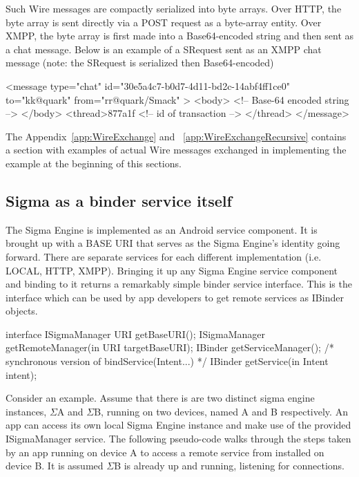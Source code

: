\documentclass[prodmode]{acmlarge}
\begin{document}
Such Wire messages are compactly serialized into byte arrays. Over HTTP, the byte array is sent directly via a POST request as a byte-array entity. Over XMPP, the byte array is first made into a Base64-encoded string and then sent as a chat message. Below is an example of a SRequest sent as an XMPP chat message (note: the SRequest is serialized then Base64-encoded)

\begin{snippet}
<message type="chat" id="30e5a4c7-b0d7-4d11-bd2c-14abf4ff1ce0"
        to="kk@quark" from="rr@quark/Smack" >
        <body> <!-- Base-64 encoded string --> </body>
        <thread>877a1f <!-- id of transaction --> </thread>
        </message>
\end{snippet}

The Appendix~\ref{app:WireExchange} and ~\ref{app:WireExchangeRecursive} contains a section with examples of actual Wire messages exchanged in implementing the example at the beginning of this sections.

\subsection{Sigma as a binder service itself}
The Sigma Engine is implemented as an Android service component. It is brought up with a BASE URI that serves as the Sigma Engine's identity going forward. There are separate services for each different implementation (i.e. LOCAL, HTTP, XMPP). Bringing it up any Sigma Engine service component and binding to it returns a remarkably simple binder service interface. This is the interface which can be used by app developers to get remote services as IBinder objects.

\begin{snippet}
interface ISigmaManager {
    URI getBaseURI();
    ISigmaManager getRemoteManager(in URI targetBaseURI);
    IBinder getServiceManager();
    /* synchronous version of bindService(Intent...) */
    IBinder getService(in Intent intent);
}
\end{snippet}

Consider an example. Assume that there is are two distinct sigma engine instances, $\Sigma$A and $\Sigma$B, running on two devices, named A and B respectively. An app can access its own local Sigma Engine instance and make use of the provided ISigmaManager service. The following pseudo-code walks through the steps taken by an app running on device A to access a remote service from installed on device B. It is assumed $\Sigma$B is already up and running, listening for connections.
\end{document}
